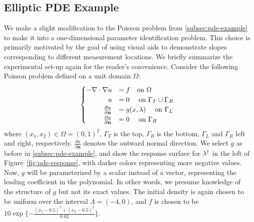 \subsection{Elliptic PDE Example}\label{sec:pde-oed-example}
We make a slight modification to the Poisson problem from \ref{subsec:pde-example} to make it into a one-dimensional parameter identification problem.
This choice is primarily motivated by the goal of using visual aids to demonstrate slopes corresponding to different measurement locations.
We briefly summarize the experimental set-up again for the reader's convenience.
Consider the following Poisson problem defined on a unit domain $\Omega$:
\begin{equation}\label{eq:pde-equation}
\begin{cases}
\hfill -\nabla \cdot \nabla u &= f \quad\text{on } \Omega \\
\hfill u &= 0 \quad\text{ on } \Gamma_T \cup \Gamma_B \\
\hfill \frac{\partial u}{\partial \mathbf{n}} &= g(x,\param) \quad\text{ on } \Gamma_L \\
\hfill \frac{\partial u}{\partial \mathbf{n}} &= 0 \quad\text{ on } \Gamma_R
\end{cases}
\end{equation}
where $(x_1, x_2) \in \Omega = (0,1)^2$, $\Gamma_T$ is the top, $\Gamma_B$ is the bottom, $\Gamma_L$ and $\Gamma_R$ left and right, respectively.
$\frac{\partial u}{\partial \mathbf{n}}$ denotes the outward normal direction.
We select $g$ as before in \ref{subsec:pde-example}, and show the response surface for $\lambda^\dagger$ in the left of Figure~\ref{fig:pde-response}, with darker colors representing more negative values.
Now, $g$ will be parameterized by a scalar instead of a vector, representing the leading coefficient in the polynomial.
In other words, we presume knowledge of the structure of $g$ but not its exact values.
The initial density is again chosen to be uniform over the interval $\Lambda = (-4, 0)$, and $f$ is chosen to be $10\exp\{-\frac{(x_1-0.5)^2 + (x_2 - 0.5)^2}{0.02}\}$.


